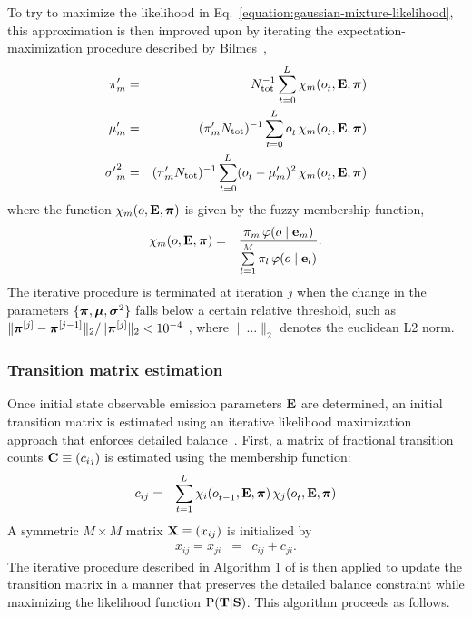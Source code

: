 \documentclass[aps,pre,twocolumn,superscriptaddress,nofootinbib,longbibliography]{revtex4-1}
\newcommand{\bfv}[1]{{\mbox{\boldmath{$#1$}}}}
\newcommand{\bfm}[1]{{\bf #1}}
\renewcommand{\Pr}{\mathrm{P}}
\begin{document}
{{\color{red} To try to maximize the likelihood in Eq.~\ref{equation:gaussian-mixture-likelihood}, this} approximation is then improved upon by iterating the expectation-maximization procedure described by Bilmes~\cite{bilmes:1998:expectation-maximization},
\begin{eqnarray}
\pi'_m &=& N_\mathrm{tot}^{-1} \sum_{t=0}^{L^{}} \chi_m(o^{}_t, \bfm{E}, \bfv{\pi}) \nonumber \\
\mu'_m &=& (\pi'_m N_\mathrm{tot})^{-1} \sum\limits_{t=0}^{L^{}} o^{}_{t} \, \chi_m(o^{}_{t}, \bfm{E}, \bfv{\pi}) \nonumber \\
{\sigma'}^2_m &=& (\pi'_m N_\mathrm{tot})^{-1} \sum\limits_{t=0}^{L^{}} (o^{}_{t} - \mu'_m)^2 \, \chi_m(o^{}_{t}, \bfm{E}, \bfv{\pi}) 
\end{eqnarray}
where the function $\chi_m(o, \bfm{E}, \bfv{\pi})$ is given by the fuzzy membership function,
\begin{eqnarray}
\chi_m(o, \bfm{E}, \bfv{\pi}) &=& \frac{\pi_m \, \varphi(o \mid \bfm{e}_m)}{\sum\limits_{l=1}^M \pi_l \, \varphi(o \mid \bfm{e}_l)} .
\end{eqnarray}
The iterative procedure is terminated at iteration $j$ when the change in the parameters $\{\bfv{\pi}, \bfv{\mu}, \bfv{\sigma}^2\}$ falls below a certain relative threshold, such as $\|\bfv{\pi}^{[j]} - \bfv{\pi}^{[j-1]}\|_2 / \|\bfv{\pi}^{[j]}\|_2 < 10^{-4}$ {\color{red}, where $\| \ldots \|_2$ denotes the euclidean L2 norm}.

\subsubsection{Transition matrix estimation}

Once initial state observable emission parameters $\bfm{E}$ are determined, an initial transition matrix is estimated using an iterative likelihood maximization approach that enforces detailed balance~\cite{noe:jcp:2011:msm-review}.
First, a matrix of fractional transition counts $\bfm{C} \equiv (c_{ij})$ is estimated using the membership function:
\begin{eqnarray}
c_{ij} &=& \sum_{t=1}^{L^{}} \chi_i(o^{}_{t-1}, \bfm{E}, \bfv{\pi}) \, \chi_j(o^{}_{t}, \bfm{E}, \bfv{\pi})
\end{eqnarray}
A symmetric $M \times M$ matrix $\bfm{X} \equiv (x_{ij})$ is initialized by
\begin{eqnarray}
x_{ij} = x_{ji} &=& c_{ij} + c_{ji} .
\end{eqnarray}
\color{red}
The iterative procedure described in Algorithm 1 of \cite{noe:jcp:2011:msm-review} is then applied to update the transition matrix in a manner that preserves the detailed balance constraint while maximizing the likelihood function $\Pr(\bfm{T} | \bfm{S})$.
This algorithm proceeds as follows.
\color{black}

}
\end{document}
